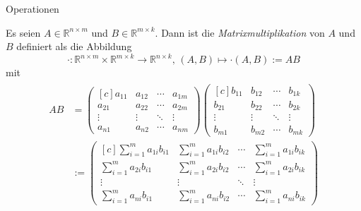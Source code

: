 \documentclass[
  8pt,
  ignorenonframetext,
]{beamer}
\begin{document}
\begin{frame}{Operationen}
\protect\hypertarget{operationen-13}{}
\footnotesize
{}
\begin{definition}[Matrixmultiplikation]
Es seien $A\in \mathbb{R}^{n \times m}$ und $B \in \mathbb{R}^{m \times k}$. Dann
ist  die \textit{Matrixmultiplikation} von $A$ und $B$ definiert als die Abbildung
\begin{equation}
\cdot : \mathbb{R}^{n\times m} \times \mathbb{R}^{m\times k} \to \mathbb{R}^{n \times k}, \,
(A,B) \mapsto \cdot(A,B) := AB
\end{equation}
mit
\begin{align}
\begin{split}
AB
& =
\begin{pmatrix*}[c]
a_{11} & a_{12} & \cdots & a_{1m} \\
a_{21} & a_{22} & \cdots & a_{2m} \\
\vdots & \vdots & \ddots & \vdots \\
a_{n1} & a_{n2} & \cdots & a_{nm}
\end{pmatrix*}
\begin{pmatrix*}[c]
b_{11} & b_{12} & \cdots & b_{1k} \\
b_{21} & b_{22} & \cdots & b_{2k} \\
\vdots & \vdots & \ddots & \vdots \\
b_{m1} & b_{m2} & \cdots & b_{mk}
\end{pmatrix*}
\\
&
:=
\begin{pmatrix*}[c]
\sum_{i=1}^m a_{1i}b_{i1} & \sum_{i=1}^m a_{1i}b_{i2} & \cdots & \sum_{i=1}^m a_{1i}b_{ik}  \\
\sum_{i=1}^m a_{2i}b_{i1} & \sum_{i=1}^m a_{2i}b_{i2} & \cdots & \sum_{i=1}^m a_{2i}b_{ik}  \\
\vdots                    & \vdots                    & \ddots & \vdots                     \\
\sum_{i=1}^m a_{ni}b_{i1} & \sum_{i=1}^m a_{ni}b_{i2} & \cdots & \sum_{i=1}^m a_{ni}b_{ik}
\end{pmatrix*}
\end{split}
\end{align}
\end{definition}
\end{frame}
\end{document}
